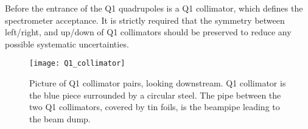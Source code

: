 
Before the entrance of the Q1 quadrupoles is a Q1 collimator, which defines
the spectrometer acceptance. It is strictly required that the symmetry between
left/right, and up/down of Q1 collimators should be preserved to reduce any
possible systematic uncertainties.
\begin{figure}[!h]
    \centering
    \texttt{[image: Q1\_collimator]}
    \caption[Q1 Collimator pairs]{Picture of Q1 collimator pairs, looking downstream. 
    Q1 collimator is the blue piece surrounded by a circular steel.
    The pipe between the two Q1 collimators, covered by tin foils, is the
    beampipe leading to the beam dump.
    }
\end{figure}

